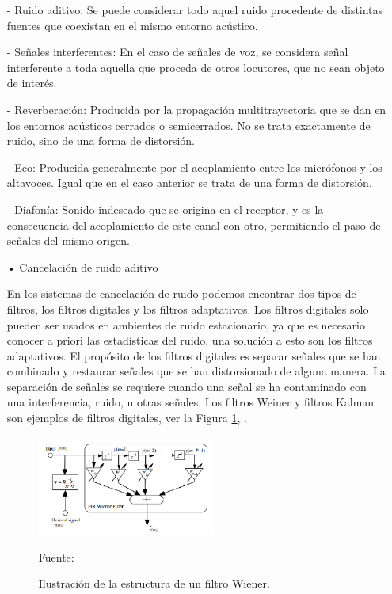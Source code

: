 \begin{enumerate}
\begin{enumerate}
\item[-]Ruido aditivo: Se puede considerar todo aquel ruido procedente de distintas fuentes que coexistan en el mismo entorno acústico.
\item[-]Señales interferentes: En el caso de señales de voz, se considera señal interferente a toda aquella que proceda de otros locutores, que no sean objeto de interés.
\item[-]Reverberación: Producida por la propagación multitrayectoria que se dan en los entornos acústicos cerrados o semicerrados. No se trata exactamente de ruido, sino de una forma de distorsión.
\item[-]Eco: Producida generalmente por el acoplamiento entre los micrófonos y los altavoces. Igual que en el caso anterior se trata de una forma de distorsión.
\item[-]Diafonía: Sonido indeseado que se origina en el receptor, y es la consecuencia del acoplamiento de este canal con otro, permitiendo el paso de señales del mismo origen.
\end{enumerate}

\begin{enumerate}
\item[•]Cancelación de ruido aditivo
\par
En los sistemas de cancelación de ruido podemos encontrar dos tipos de filtros, los filtros digitales y los filtros adaptativos. Los filtros digitales solo pueden ser usados en ambientes de ruido estacionario, ya que es necesario conocer a priori las estadísticas del ruido, una solución a esto son los filtros adaptativos.
\vskip 0.5cm
El propósito de los filtros digitales es separar señales que se han combinado y restaurar señales que se han distorsionado de alguna manera. La separación de señales se requiere cuando una señal se ha contaminado con una interferencia, ruido, u otras señales. Los filtros Weiner y filtros Kalman son ejemplos de filtros digitales, ver la Figura \ref{fig:figura2.14}, \cite{shubhra}.

\newpage
\vskip 0.5cm
\begin{figure}[ht]
\begin{center}
\includegraphics[width=0.55\textwidth]{Imagenes/Cap2/image014}
\end{center}
\begin{center}
\vskip -0.5cm
\caption{\small{Ilustración de la estructura de un filtro Wiener.}}
\label{fig:figura2.14}
{\small{Fuente: \cite{shubhra}}}
\end{center}
\end{figure}


\end{enumerate}
\end{enumerate}
